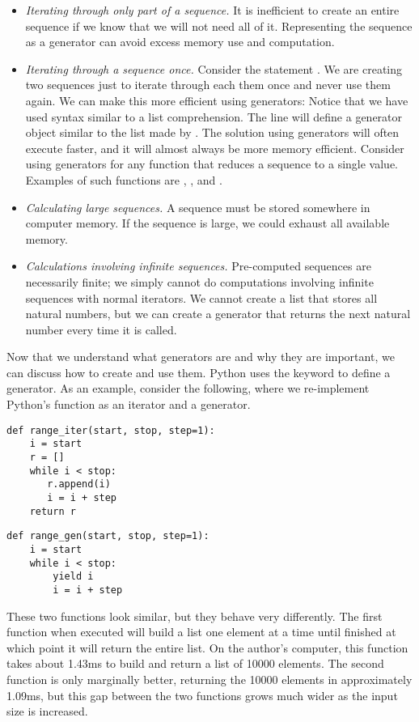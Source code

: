 \begin{itemize}
\item \emph{Iterating through only part of a sequence.}
It is inefficient to create an entire sequence if we know that we will not need all of it.
Representing the sequence as a generator can avoid excess memory use and computation.
\item \emph{Iterating through a sequence once.} Consider the statement
.
We are creating two sequences just to iterate through each them once and never use them again.
We can make this more efficient using generators:
Notice that we have used syntax similar to a list comprehension.
The line  will define a generator object similar to the list made by \li{[i for i in xrange(1000) if i\%2 == 0]}.
The solution using generators will often execute faster, and it will almost always be more memory efficient.  Consider using generators for any function that reduces a sequence to a single value.  Examples of such functions are , , and .
\item \emph{Calculating large sequences.}  A sequence must be stored somewhere in computer memory.
If the sequence is large, we could exhaust all available memory.
\item \emph{Calculations involving infinite sequences.}  Pre-computed sequences are necessarily finite; we simply cannot do computations involving infinite sequences with normal iterators. We cannot create a list that stores all natural numbers, but we can create a generator that returns the next natural number every time it is called.
\end{itemize}

Now that we understand what generators are and why they are important, we can discuss how to create and use them. Python uses the  keyword to define a generator. As an example, consider the following, where we re-implement Python's  function as an iterator and a generator.
\begin{lstlisting}
def range_iter(start, stop, step=1):
    i = start
    r = []
    while i < stop:
       r.append(i)
       i = i + step
    return r
\end{lstlisting}
\begin{lstlisting}
def range_gen(start, stop, step=1):
    i = start
    while i < stop:
        yield i
        i = i + step
\end{lstlisting}
These two functions look similar, but they behave very differently.
The first function when executed will build a list one element at a time until finished
at which point it will return the entire list.  On the author's computer, this function takes about 1.43ms
to build and return a list of 10000 elements.  The second function is only marginally better,
returning the 10000 elements in approximately 1.09ms, but this gap between the two functions grows much wider as the input size is increased.

